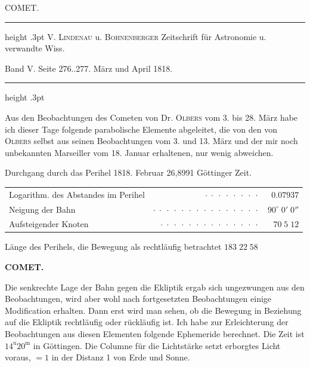\par\bigskip
{}
\hypertarget{native-407-part-lower}{}\label{native-407-part-lower}
\begin{center}\large COMET.\end{center}
\begin{center}
\parbox{.84\linewidth}{%
\centering\small
\hrule height .3pt\relax\vspace{2.5pt}
V. \textsc{Lindenau} u. \textsc{Bohnenberger} Zeitschrift für Astronomie u. verwandte Wiss.\par
Band V. Seite 276..277. März und April 1818.\par
\vspace{2.5pt}\hrule height .3pt\relax
}
\end{center}
\par\indent Aus den Beobachtungen des Cometen von Dr. \textsc{Olbers} vom 3. bis 28. März
habe ich dieser Tage folgende parabolische Elemente abgeleitet, die von den von
\textsc{Olbers} selbst aus seinen Beobachtungen vom 3. und 13. März und der mir noch
unbekannten Marseiller vom 18. Januar erhaltenen, nur wenig abweichen.

\begin{center}\fontsize{10}{12}\selectfont
Durchgang durch das Perihel 1818. Februar 26,8991 Göttinger Zeit.
\par\smallskip\begin{tabular}{lrr}
Logarithm. des Abstandes im Perihel & $\cdot\;\cdot\;\cdot\;\cdot\;\cdot\;\cdot\;\cdot\;\cdot$ & $0.07937$\\
Neigung der Bahn & $\cdot\;\cdot\;\cdot\;\cdot\;\cdot\;\cdot\;\cdot\;\cdot\;\cdot\;\cdot\;\cdot\;\cdot\;\cdot\;\cdot\;\cdot$ & $90^\circ\;0'\;0''$\\
Aufsteigender Knoten & $\cdot\;\cdot\;\cdot\;\cdot\;\cdot\;\cdot\;\cdot\;\cdot\;\cdot\;\cdot\;\cdot\;\cdot\;\cdot\;\cdot$ & $70\;5\;12$\\
\end{tabular}
\par\smallskip Länge des Perihels, die Bewegung als rechtläufig betrachtet $183\;22\;58$
\end{center}
\clearpage
\thispagestyle{empty}
\noindent{}%
\makebox[12mm][l]{}%
\parbox[t]{\dimexpr\linewidth-24mm\relax}{\centering\footnotesize\bfseries COMET.\par}%
\par\nobreak\medskip
\par\indent Die senkrechte Lage der Bahn gegen die Ekliptik ergab sich ungezwungen aus den
Beobachtungen, wird aber wohl nach fortgesetzten Beobachtungen einige
Modification erhalten. Dann erst wird man sehen, ob die Bewegung in Beziehung
auf die Ekliptik rechtläufig oder rückläufig ist. Ich habe zur Erleichterung
der Beobachtungen aus diesen Elementen folgende Ephemeride berechnet. Die
Zeit ist $14^{\mathrm u}20^{\mathrm m}$ in Göttingen. Die Columne für die
Lichtstärke setzt erborgtes Licht voraus, $=1$ in der Distanz 1 von Erde und
Sonne.

